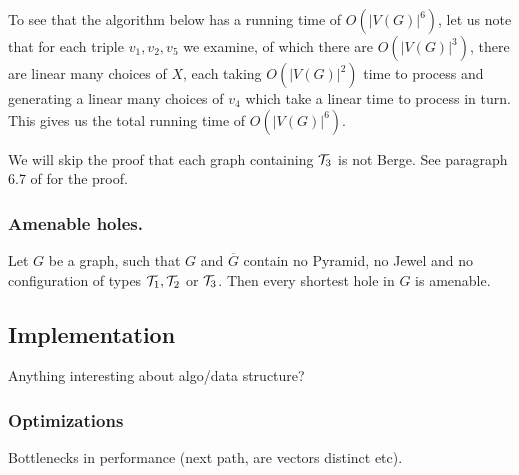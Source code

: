\documentclass{article}
\begin{document}
To see that the algorithm below has a running time of $O(|V(G)|^6)$, let us note that for each triple $v_1, v_2, v_5$ we examine, of which there are $O(|V(G)|^3)$, there are linear many choices of $X$, each taking $O(|V(G)|^2)$ time to process and generating a linear many choices of $v_4$ which take a linear time to process in turn. This gives us the total running time of $O(|V(G)|^6)$.

We will skip the proof that each graph containing $\mathcal{T}_3$ is not Berge. See paragraph 6.7 of \cite{MC05} for the proof.

\subsubsection{Amenable holes.}
\label{AmenableHoles}

\begin{theorem}
	Let $G$ be a graph, such that $G$ and $\overline{G}$ contain no Pyramid, no Jewel and no configuration of types $\mathcal{T}_1, \mathcal{T}_2$ or $\mathcal{T}_3$. Then every shortest hole in $G$ is amenable.
\end{theorem}




\subsection{Implementation}

Anything interesting about algo/data structure?\\

\subsubsection{Optimizations}\label{Optimizations}
Bottlenecks in performance (next path, are vectors distinct etc).\\
\end{document}
